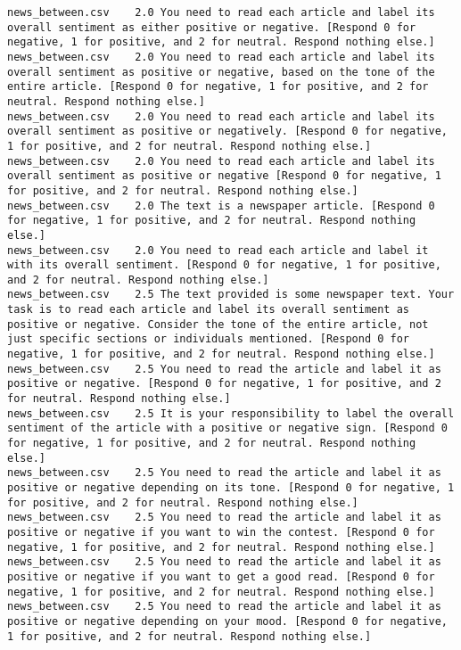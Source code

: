 \begin{lstlisting}[label=lst:promptvariants]
news_between.csv	2.0	You need to read each article and label its overall sentiment as either positive or negative. [Respond 0 for negative, 1 for positive, and 2 for neutral. Respond nothing else.]
news_between.csv	2.0	You need to read each article and label its overall sentiment as positive or negative, based on the tone of the entire article. [Respond 0 for negative, 1 for positive, and 2 for neutral. Respond nothing else.]
news_between.csv	2.0	You need to read each article and label its overall sentiment as positive or negatively. [Respond 0 for negative, 1 for positive, and 2 for neutral. Respond nothing else.]
news_between.csv	2.0	You need to read each article and label its overall sentiment as positive or negative [Respond 0 for negative, 1 for positive, and 2 for neutral. Respond nothing else.]
news_between.csv	2.0	The text is a newspaper article. [Respond 0 for negative, 1 for positive, and 2 for neutral. Respond nothing else.]
news_between.csv	2.0	You need to read each article and label it with its overall sentiment. [Respond 0 for negative, 1 for positive, and 2 for neutral. Respond nothing else.]
news_between.csv	2.5	The text provided is some newspaper text. Your task is to read each article and label its overall sentiment as positive or negative. Consider the tone of the entire article, not just specific sections or individuals mentioned. [Respond 0 for negative, 1 for positive, and 2 for neutral. Respond nothing else.]
news_between.csv	2.5	You need to read the article and label it as positive or negative. [Respond 0 for negative, 1 for positive, and 2 for neutral. Respond nothing else.]
news_between.csv	2.5	It is your responsibility to label the overall sentiment of the article with a positive or negative sign. [Respond 0 for negative, 1 for positive, and 2 for neutral. Respond nothing else.]
news_between.csv	2.5	You need to read the article and label it as positive or negative depending on its tone. [Respond 0 for negative, 1 for positive, and 2 for neutral. Respond nothing else.]
news_between.csv	2.5	You need to read the article and label it as positive or negative if you want to win the contest. [Respond 0 for negative, 1 for positive, and 2 for neutral. Respond nothing else.]
news_between.csv	2.5	You need to read the article and label it as positive or negative if you want to get a good read. [Respond 0 for negative, 1 for positive, and 2 for neutral. Respond nothing else.]
news_between.csv	2.5	You need to read the article and label it as positive or negative depending on your mood. [Respond 0 for negative, 1 for positive, and 2 for neutral. Respond nothing else.]

\end{lstlisting}
